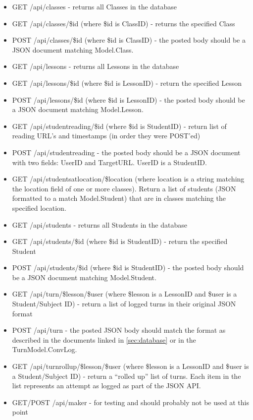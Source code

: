 \documentclass[letterpaper,10pt]{article}
\newcommand{\fullxref}[1]{ \ref{#1} \nameref{#1} }
\begin{document}
\begin{itemize}
    \item GET /api/classes - returns all Classes in the database
    \item GET /api/classes/\$id (where \$id is ClassID) - returns the specified Class
    \item POST /api/classes/\$id (where \$id is ClassID) - the posted body should be
          a JSON document matching Model.Class.
          
    \item GET /api/lessons - returns all Lessons in the database
    \item GET /api/lessons/\$id (where \$id is LessonID) - return the specified Lesson
    \item POST /api/lessons/\$id (where \$id is LessonID) - the posted body should be
          a JSON document matching Model.Lesson.

    \item GET /api/studentreading/\$id (where \$id is StudentID) - return list of
          reading URL's and timestamps (in order they were POST'ed)
    \item POST /api/studentreading - the posted body should be a JSON document with
          two fields: UserID and TargetURL.  UserID is a StudentID.

    \item GET /api/studentsatlocation/\$location (where location is a string matching
          the location field of one or more classes).  Return a list of students (JSON
          formatted to a match Model.Student) that are in classes matching the specified
          location.

    \item GET /api/students - returns all Students in the database
    \item GET /api/students/\$id (where \$id is StudentID) - return the specified Student
    \item POST /api/students/\$id (where \$id is StudentID) - the posted body should be
          a JSON document matching Model.Student.
    
    \item GET /api/turn/\$lesson/\$user (where \$lesson is a LessonID and \$user is a
          Student/Subject ID) - return a list of logged turns in their original JSON
          format
    \item POST /api/turn - the posted JSON body should match the format as described
          in the documents linked in \fullxref{sec:database} or in the TurnModel.ConvLog.
    
    \item GET /api/turnrollup/\$lesson/\$user (where \$lesson is a LessonID and \$user is a
          Student/Subject ID) - return a ``rolled up'' list of turns.  Each item in the list
          represents an attempt as logged as part of the JSON API.
    
    \item GET/POST /api/maker - for testing and should probably not be used at this point
\end{itemize}
\end{document}
